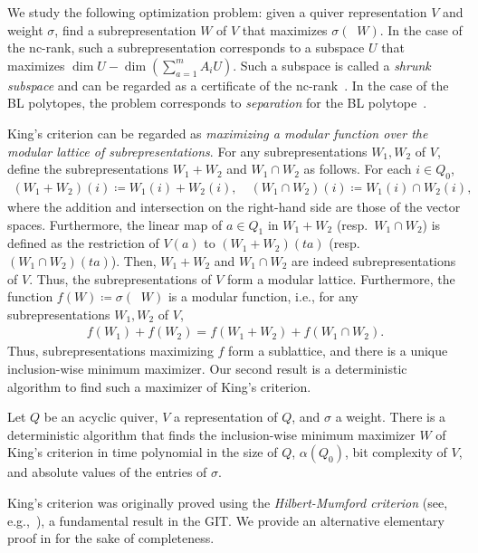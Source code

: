 \documentclass[a4paper,11pt]{article}
\numberwithin{equation}{section}
\DeclareMathOperator{\dimv}{\underline{dim}}
\begin{document}
We study the following optimization problem: given a quiver representation $V$ and weight $\sigma$, find a subrepresentation $W$ of $V$ that maximizes $\sigma(\dimv W)$.
In the case of the nc-rank, such a subrepresentation corresponds to a subspace $U$ that maximizes $\dim U - \dim(\sum_{a=1}^m A_i U)$.
Such a subspace is called a \emph{shrunk subspace} and can be regarded as a certificate of the nc-rank~\citep{Ivanyos2018,Franks2023}.
In the case of the BL polytopes, the problem corresponds to \emph{separation} for the BL polytope~\citep{Garg2018}.

King's criterion can be regarded as \emph{maximizing a modular function over the modular lattice of subrepresentations}.
For any subrepresentations $W_1, W_2$ of $V$, define the subrepresentations $W_1 + W_2$ and $W_1 \cap W_2$ as follows.
For each $i \in Q_0$, 
\begin{align}
    (W_1 + W_2)(i) \coloneqq W_1(i) + W_2(i), \quad
    (W_1 \cap W_2)(i) \coloneqq W_1(i) \cap W_2(i),
\end{align}
where the addition and intersection on the right-hand side are those of the vector spaces.
Furthermore, the linear map of $a \in Q_1$ in $W_1 + W_2$ (resp.~$W_1 \cap W_2$) is defined as the restriction of $V(a)$ to $(W_1 + W_2)(ta)$ (resp.~$(W_1 \cap W_2)(ta)$).
Then, $W_1 + W_2$ and $W_1 \cap W_2$ are indeed subrepresentations of $V$.
Thus, the subrepresentations of $V$ form a modular lattice. 
Furthermore, the function $f(W) \coloneqq \sigma(\dimv W)$ is a modular function, i.e., for any subrepresentations $W_1, W_2$ of $V$,
\begin{align}
    f(W_1) + f(W_2) = f(W_1 + W_2) + f(W_1 \cap W_2).
\end{align}
Thus, subrepresentations maximizing $f$ form a sublattice, and there is a unique inclusion-wise minimum maximizer.
Our second result is a deterministic algorithm to find such a maximizer of King's criterion.

\begin{theorem}
    Let $Q$ be an acyclic quiver, $V$ a representation of $Q$, and $\sigma$ a weight.
    There is a deterministic algorithm that finds the inclusion-wise minimum maximizer $W$ of King's criterion in time polynomial in the size of $Q$, $\alpha(Q_0)$, bit complexity of $V$, and absolute values of the entries of $\sigma$.
\end{theorem}

King's criterion was originally proved using the \emph{Hilbert-Mumford criterion} (see, e.g.,~\cite[Sections 9.6 and 9.8]{Derksen2017book}), a fundamental result in the GIT.
We provide an alternative elementary proof in  for the sake of completeness.
\end{document}
